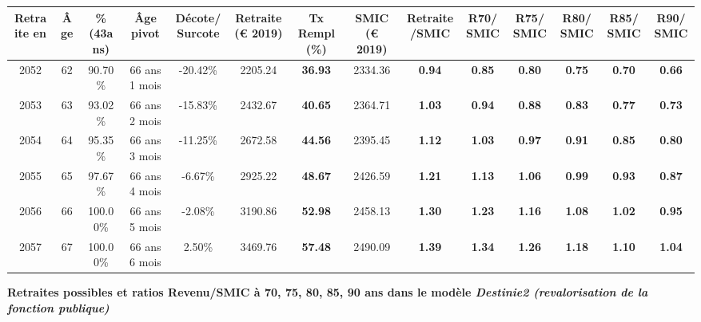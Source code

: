 \begin{adjustbox}{max width=\textwidth} 
\begin{tabular}[htb]{|c|c||c|c|c||c|c||c|c||c|c|c|c|c|} 
\hline 
 Retraite en &  Âge &  \%(43ans) &  Âge pivot &  Décote/Surcote &  Retraite (\euro{} 2019) &  Tx Rempl(\%) &  SMIC (\euro{} 2019) &  Retraite/SMIC &  R70/SMIC &  R75/SMIC &  R80/SMIC &  R85/SMIC &  R90/SMIC \\ 
\hline \hline 
 2052 &  62 &  90.70\% &  66 ans 1 mois &  -20.42\% &  2205.24 &  {\bf 36.93} &  2334.36 &  {\bf {\color{red} 0.94}} &  {\bf {\color{red} 0.85}} &  {\bf {\color{red} 0.80}} &  {\bf {\color{red} 0.75}} &  {\bf {\color{red} 0.70}} &  {\bf {\color{red} 0.66}} \\ 
\hline 
 2053 &  63 &  93.02\% &  66 ans 2 mois &  -15.83\% &  2432.67 &  {\bf 40.65} &  2364.71 &  {\bf 1.03} &  {\bf {\color{red} 0.94}} &  {\bf {\color{red} 0.88}} &  {\bf {\color{red} 0.83}} &  {\bf {\color{red} 0.77}} &  {\bf {\color{red} 0.73}} \\ 
\hline 
 2054 &  64 &  95.35\% &  66 ans 3 mois &  -11.25\% &  2672.58 &  {\bf 44.56} &  2395.45 &  {\bf 1.12} &  {\bf 1.03} &  {\bf {\color{red} 0.97}} &  {\bf {\color{red} 0.91}} &  {\bf {\color{red} 0.85}} &  {\bf {\color{red} 0.80}} \\ 
\hline 
 2055 &  65 &  97.67\% &  66 ans 4 mois &  -6.67\% &  2925.22 &  {\bf 48.67} &  2426.59 &  {\bf 1.21} &  {\bf 1.13} &  {\bf 1.06} &  {\bf {\color{red} 0.99}} &  {\bf {\color{red} 0.93}} &  {\bf {\color{red} 0.87}} \\ 
\hline 
 2056 &  66 &  100.00\% &  66 ans 5 mois &  -2.08\% &  3190.86 &  {\bf 52.98} &  2458.13 &  {\bf 1.30} &  {\bf 1.23} &  {\bf 1.16} &  {\bf 1.08} &  {\bf 1.02} &  {\bf {\color{red} 0.95}} \\ 
\hline 
 2057 &  67 &  100.00\% &  66 ans 6 mois &  2.50\% &  3469.76 &  {\bf 57.48} &  2490.09 &  {\bf 1.39} &  {\bf 1.34} &  {\bf 1.26} &  {\bf 1.18} &  {\bf 1.10} &  {\bf 1.04} \\ 
\hline 
\hline 
\end{tabular} 
\end{adjustbox} 
 
 \vspace{0.1cm} 
{\bf \noindent Retraites possibles et ratios Revenu/SMIC à 70, 75, 80, 85, 90 ans dans le modèle \emph{Destinie2 (revalorisation de la fonction publique)}}  
 
